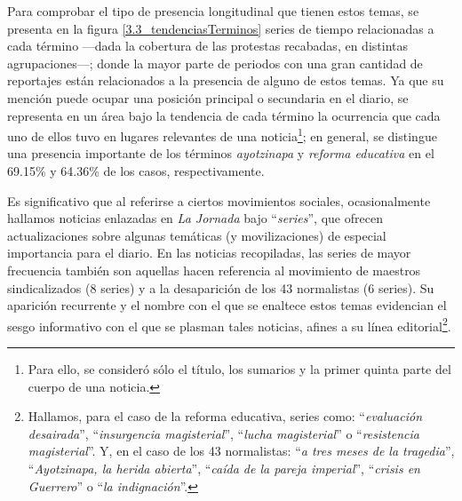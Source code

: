 \documentclass[letterpaper, 11pt]{book}
\theoremstyle{definition}
\theoremstyle{remark}
\begin{document}
Para comprobar el tipo de presencia longitudinal que tienen estos temas, se presenta en la figura \ref{3.3_tendenciasTerminos} series de tiempo relacionadas a cada término ---dada la cobertura de las protestas recabadas, en distintas agrupaciones---; donde la mayor parte de periodos con una gran cantidad de reportajes están relacionados a la presencia de alguno de estos temas. 
Ya que su mención puede ocupar una posición principal o secundaria en el diario, se representa en un área bajo la tendencia de cada término la ocurrencia que cada uno de ellos tuvo en lugares relevantes de una noticia\footnote{
    Para ello, se consideró sólo el título, los sumarios y la primer quinta parte del cuerpo de una noticia.
}; 
en general, se distingue una presencia importante de los términos \emph{ayotzinapa} y \emph{reforma educativa} en el 69.15\% y 64.36\% de los casos, respectivamente. 





Es significativo que al referirse a ciertos movimientos sociales, ocasionalmente hallamos noticias enlazadas en \emph{La Jornada} bajo ``\emph{series}'', que ofrecen actualizaciones sobre algunas temáticas (y movilizaciones) de especial importancia para el diario.  
En las noticias recopiladas, las series de mayor frecuencia también son aquellas hacen referencia al movimiento de maestros sindicalizados (8 series) y a la desaparición de los 43 normalistas (6 series). 
Su aparición recurrente y el nombre con el que se enaltece estos temas evidencian el sesgo informativo con el que se plasman tales noticias, afines a su línea editorial\footnote{
   Hallamos, para el caso de la reforma educativa, series como: ``\emph{evaluación desairada}'', ``\emph{insurgencia magisterial}'', ``\emph{lucha magisterial}'' o ``\emph{resistencia magisterial}''. 
   Y, en el caso de los 43 normalistas: ``\emph{a tres meses de la tragedia}'', ``\emph{Ayotzinapa, la herida abierta}'', ``\emph{caída de la pareja imperial}'', ``\emph{crisis en Guerrero}'' o ``\emph{la indignación}''. 
}. 
\end{document}
